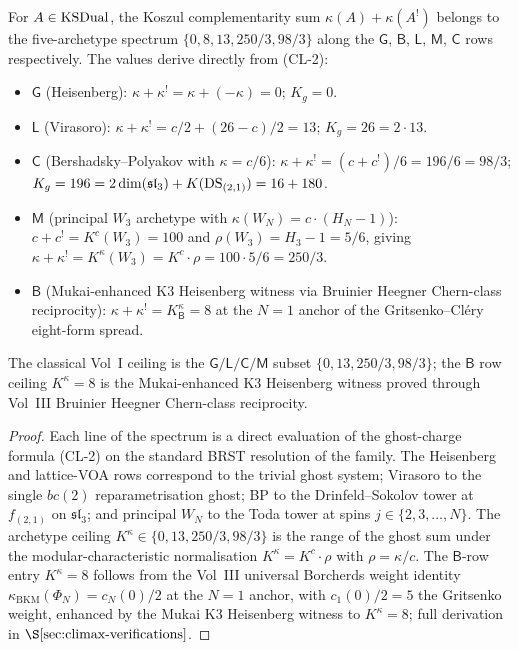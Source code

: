 \begin{corollary}
\label{cor:thmC-from-climax}
\ClaimStatusProvedHere
For \(A \in \mathrm{KSDual}\), the Koszul complementarity sum
\(\kappa(A) + \kappa(A^{!})\) belongs to the five-archetype spectrum
\(\{0, 8, 13, 250/3, 98/3\}\) along the \(\mathsf{G}\), \(\mathsf{B}\),
\(\mathsf{L}\), \(\mathsf{M}\), \(\mathsf{C}\) rows respectively. The
values derive directly from \textup{(CL-2)}:
\begin{itemize}
\item \(\mathsf{G}\) \textup{(}Heisenberg\textup{):}
  \(\kappa + \kappa^{!} = \kappa + (-\kappa) = 0\); \(K_{g} = 0\).
\item \(\mathsf{L}\) \textup{(}Virasoro\textup{):}
  \(\kappa + \kappa^{!} = c/2 + (26-c)/2 = 13\); \(K_{g} = 26 = 2 \cdot 13\).
\item \(\mathsf{C}\) \textup{(}Bershadsky--Polyakov with
  \(\kappa = c/6\)\textup{):}
  \(\kappa + \kappa^{!} = (c + c^{!})/6 = 196/6 = 98/3\);
  \(K_{g} = 196 = 2 \dim(\mathfrak{sl}_{3}) + K(\mathrm{DS}_{(2,1)}) = 16 + 180\).
\item \(\mathsf{M}\) \textup{(}principal \(W_{3}\) archetype with
  \(\kappa(W_{N}) = c \cdot (H_{N}-1)\)\textup{):}
  \(c + c^{!} = K^{c}(W_{3}) = 100\) and
  \(\rho(W_{3}) = H_{3} - 1 = 5/6\), giving
  \(\kappa + \kappa^{!} = K^{\kappa}(W_{3}) = K^{c} \cdot \rho = 100 \cdot 5/6 = 250/3\).
\item \(\mathsf{B}\) \textup{(}Mukai-enhanced K3 Heisenberg witness via Bruinier Heegner Chern-class reciprocity\textup{):}
  \(\kappa + \kappa^{!} = K^{\kappa}_{\mathsf{B}} = 8\) at the \(N=1\) anchor of the
  Gritsenko--Cl\'ery eight-form spread.
\end{itemize}
The classical Vol~I ceiling is the \(\mathsf{G}/\mathsf{L}/\mathsf{C}/\mathsf{M}\) subset
\(\{0, 13, 250/3, 98/3\}\); the \(\mathsf{B}\) row ceiling \(K^{\kappa} = 8\)
is the Mukai-enhanced K3 Heisenberg witness proved through
Vol~III Bruinier Heegner Chern-class reciprocity.
\end{corollary}

\begin{proof}
Each line of the spectrum is a direct evaluation of the ghost-charge
formula \textup{(CL-2)} on the standard BRST resolution of the family.
The Heisenberg and lattice-VOA rows correspond to the trivial ghost
system; Virasoro to the single \(bc(2)\) reparametrisation ghost; BP to
the Drinfeld--Sokolov tower at \(f_{(2,1)}\) on \(\mathfrak{sl}_{3}\);
and principal \(W_{N}\) to the Toda tower at spins
\(j \in \{2, 3, \ldots, N\}\). The archetype ceiling
\(K^{\kappa} \in \{0, 13, 250/3, 98/3\}\) is the range of the ghost
sum under the modular-characteristic normalisation
\(K^{\kappa} = K^{c} \cdot \rho\) with \(\rho = \kappa/c\). The
\(\mathsf{B}\)-row entry \(K^{\kappa} = 8\) follows from the Vol~III
universal Borcherds weight identity
\(\kappa_{\mathrm{BKM}}(\Phi_{N}) = c_{N}(0)/2\) at the \(N=1\) anchor,
with \(c_{1}(0)/2 = 5\) the Gritsenko weight, enhanced by the Mukai
K3 Heisenberg witness to \(K^{\kappa} = 8\); full derivation in
\(\S\ref{sec:climax-verifications}\).
\end{proof}

